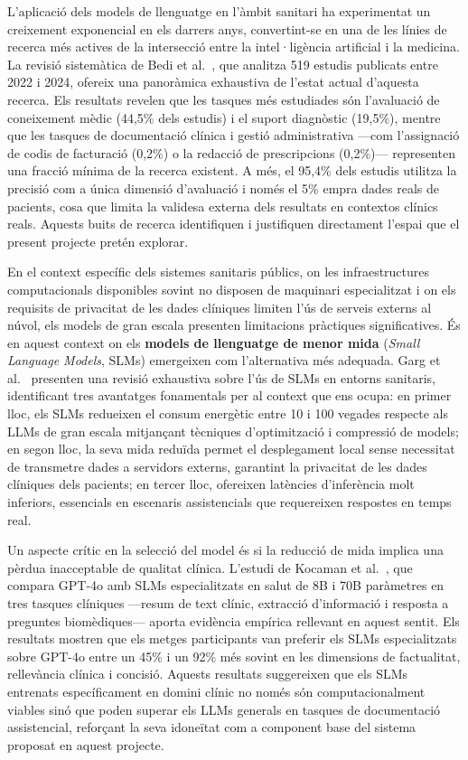 \documentclass[CAT]{TFUOC}%
\begin{document}
L'aplicació dels models de llenguatge en l'àmbit sanitari ha experimentat un creixement exponencial en els darrers anys, convertint-se en una de les línies de recerca més actives de la intersecció entre la intel·ligència artificial i la medicina. La revisió sistemàtica de Bedi et al.~\cite{bedi2025llm}, que analitza 519 estudis publicats entre 2022 i 2024, ofereix una panoràmica exhaustiva de l'estat actual d'aquesta recerca. Els resultats revelen que les tasques més estudiades són l'avaluació de coneixement mèdic (44,5\% dels estudis) i el suport diagnòstic (19,5\%), mentre que les tasques de documentació clínica i gestió administrativa ---com l'assignació de codis de facturació (0,2\%) o la redacció de prescripcions (0,2\%)--- representen una fracció mínima de la recerca existent. A més, el 95,4\% dels estudis utilitza la precisió com a única dimensió d'avaluació i només el 5\% empra dades reals de pacients, cosa que limita la validesa externa dels resultats en contextos clínics reals. Aquests buits de recerca identifiquen i justifiquen directament l'espai que el present projecte pretén explorar.

En el context específic dels sistemes sanitaris públics, on les infraestructures computacionals disponibles sovint no disposen de maquinari especialitzat i on els requisits de privacitat de les dades clíniques limiten l'ús de serveis externs al núvol, els models de gran escala presenten limitacions pràctiques significatives. És en aquest context on els \textbf{models de llenguatge de menor mida} (\textit{Small Language Models}, SLMs) emergeixen com l'alternativa més adequada. Garg et al.~\cite{garg2025slm} presenten una revisió exhaustiva sobre l'ús de SLMs en entorns sanitaris, identificant tres avantatges fonamentals per al context que ens ocupa: en primer lloc, els SLMs redueixen el consum energètic entre 10 i 100 vegades respecte als LLMs de gran escala mitjançant tècniques d'optimització i compressió de models; en segon lloc, la seva mida reduïda permet el desplegament local sense necessitat de transmetre dades a servidors externs, garantint la privacitat de les dades clíniques dels pacients; en tercer lloc, ofereixen latències d'inferència molt inferiors, essencials en escenaris assistencials que requereixen respostes en temps real.

Un aspecte crític en la selecció del model és si la reducció de mida implica una pèrdua inacceptable de qualitat clínica. L'estudi de Kocaman et al.~\cite{kocaman2025clever}, que compara GPT-4o amb SLMs especialitzats en salut de 8B i 70B paràmetres en tres tasques clíniques ---resum de text clínic, extracció d'informació i resposta a preguntes biomèdiques--- aporta evidència empírica rellevant en aquest sentit. Els resultats mostren que els metges participants van preferir els SLMs especialitzats sobre GPT-4o entre un 45\% i un 92\% més sovint en les dimensions de factualitat, rellevància clínica i concisió. Aquests resultats suggereixen que els SLMs entrenats específicament en domini clínic no només són computacionalment viables sinó que poden superar els LLMs generals en tasques de documentació assistencial, reforçant la seva idoneïtat com a component base del sistema proposat en aquest projecte.
\end{document}
